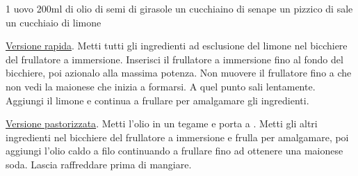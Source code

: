 \label{maionese}
\begin{ingreds}
	1 uovo 
	200ml di olio di semi di girasole
	un cucchiaino di senape 
	un pizzico di sale
	un cucchiaio di limone 

\end{ingreds}

\begin{method}
\underline{Versione rapida}. Metti tutti gli ingredienti ad esclusione del limone nel bicchiere del frullatore a immersione. Inserisci il frullatore a immersione fino al fondo del bicchiere, poi azionalo alla massima potenza. Non muovere il frullatore fino a che non vedi la maionese che inizia a formarsi. A quel punto sali lentamente. Aggiungi il limone e continua a frullare per amalgamare gli ingredienti.

\underline{Versione pastorizzata}. Metti l'olio in un tegame e porta a . Metti gli altri ingredienti nel bicchiere del frullatore a immersione e frulla per amalgamare, poi aggiungi l'olio caldo a filo continuando a frullare fino ad ottenere una maionese soda. Lascia raffreddare prima di mangiare.




\end{method}



